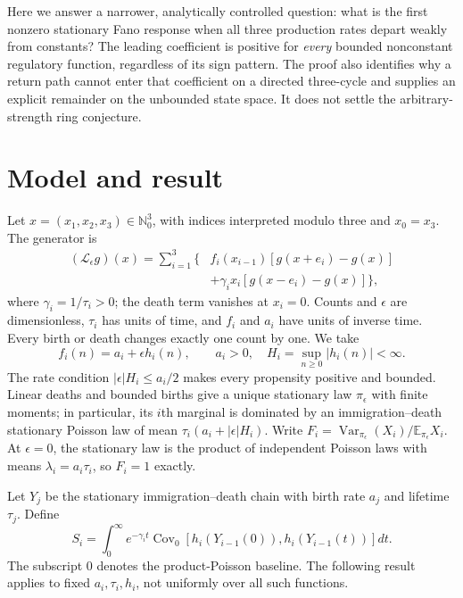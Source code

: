 \documentclass[aps,pre,twocolumn,showpacs,amsmath,amssymb]{revtex4-2}
\begin{document}
Here we answer a narrower, analytically controlled question: what is the first nonzero stationary Fano response when all three production rates depart weakly from constants? The leading coefficient is positive for \emph{every} bounded nonconstant regulatory function, regardless of its sign pattern. The proof also identifies why a return path cannot enter that coefficient on a directed three-cycle and supplies an explicit remainder on the unbounded state space. It does not settle the arbitrary-strength ring conjecture.

\section{Model and result}
Let $x=(x_1,x_2,x_3)\in\mathbb N_0^3$, with indices interpreted modulo three and $x_0=x_3$. The generator is
\begin{equation}
\begin{split}
(\mathcal L_\epsilon g)(x)=\sum_{i=1}^3\bigl\{&f_i(x_{i-1})[g(x+e_i)-g(x)]\\
&+\gamma_i x_i[g(x-e_i)-g(x)]\bigr\},
\end{split}\label{eq:generator}
\end{equation}
where $\gamma_i=1/\tau_i>0$; the death term vanishes at $x_i=0$. Counts and $\epsilon$ are dimensionless, $\tau_i$ has units of time, and $f_i$ and $a_i$ have units of inverse time. Every birth or death changes exactly one count by one. We take
\begin{equation}
f_i(n)=a_i+\epsilon h_i(n),\qquad a_i>0,\quad H_i=\sup_{n\geq0}|h_i(n)|<\infty.\label{eq:rates}
\end{equation}
The rate condition $|\epsilon|H_i\leq a_i/2$ makes every propensity positive and bounded. Linear deaths and bounded births give a unique stationary law $\pi_\epsilon$ with finite moments; in particular, its $i$th marginal is dominated by an immigration--death stationary Poisson law of mean $\tau_i(a_i+|\epsilon|H_i)$. Write $F_i=\operatorname{Var}_{\pi_\epsilon}(X_i)/\mathbb E_{\pi_\epsilon}X_i$. At $\epsilon=0$, the stationary law is the product of independent Poisson laws with means $\lambda_i=a_i\tau_i$, so $F_i=1$ exactly.

Let $Y_j$ be the stationary immigration--death chain with birth rate $a_j$ and lifetime $\tau_j$. Define
\begin{equation}
S_i=\int_0^\infty e^{-\gamma_i t}
\operatorname{Cov}_0\!\left[h_i(Y_{i-1}(0)),h_i(Y_{i-1}(t))\right]dt .\label{eq:S}
\end{equation}
The subscript $0$ denotes the product-Poisson baseline. The following result applies to fixed $a_i,\tau_i,h_i$, not uniformly over all such functions.
\end{document}
